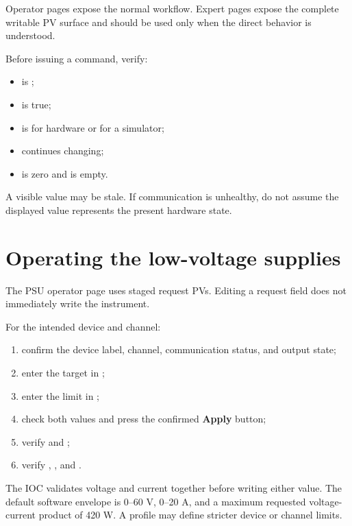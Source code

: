 Operator pages expose the normal workflow. Expert pages expose the complete writable PV surface and should be used only when the direct behavior is understood.

Before issuing a command, verify:

\begin{itemize}
  \item {} is ;
  \item {} is true;
  \item {} is  for hardware or  for a simulator;
  \item {} continues changing;
  \item {} is zero and  is empty.
\end{itemize}

A visible value may be stale. If communication is unhealthy, do not assume the displayed value represents the present hardware state.

\section{Operating the low-voltage supplies}

The PSU operator page uses staged request PVs. Editing a request field does not immediately write the instrument.

For the intended device and channel:

\begin{enumerate}
  \item confirm the device label, channel, communication status, and output state;
  \item enter the target in ;
  \item enter the limit in ;
  \item check both values and press the confirmed \textbf{Apply} button;
  \item verify  and ;
  \item verify , , and .
\end{enumerate}

The IOC validates voltage and current together before writing either value. The default software envelope is 0--60 V, 0--20 A, and a maximum requested voltage-current product of 420 W. A profile may define stricter device or channel limits.

